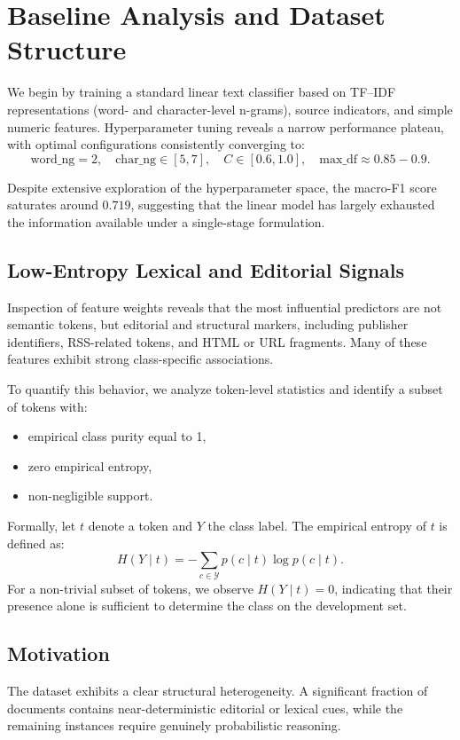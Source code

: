 \section{Baseline Analysis and Dataset Structure}

We begin by training a standard linear text classifier based on TF--IDF representations (word- and character-level n-grams), source indicators, and simple numeric features.
Hyperparameter tuning reveals a narrow performance plateau, with optimal configurations consistently converging to:
\[
\text{word\_ng} = 2,\quad \text{char\_ng} \in [5,7],\quad C \in [0.6,1.0],\quad \text{max\_df} \approx 0.85{-}0.9.
\]

Despite extensive exploration of the hyperparameter space, the macro-F1 score saturates around $0.719$, suggesting that the linear model has largely exhausted the information available under a single-stage formulation.
\subsection{Low-Entropy Lexical and Editorial Signals}

Inspection of feature weights reveals that the most influential predictors are not semantic tokens, but editorial and structural markers, including publisher identifiers, RSS-related tokens, and HTML or URL fragments.
Many of these features exhibit strong class-specific associations.

To quantify this behavior, we analyze token-level statistics and identify a subset of tokens with:
\begin{itemize}
	\item empirical class purity equal to 1,
	\item zero empirical entropy,
	\item non-negligible support.
\end{itemize}

Formally, let $t$ denote a token and $Y$ the class label.
The empirical entropy of $t$ is defined as:
\[
H(Y \mid t) = - \sum_{c \in \mathcal{Y}} p(c \mid t)\log p(c \mid t).
\]
For a non-trivial subset of tokens, we observe $H(Y \mid t) = 0$, indicating that their presence alone is sufficient to determine the class on the development set.
\subsection{Motivation}

The dataset exhibits a clear structural heterogeneity.
A significant fraction of documents contains near-deterministic editorial or lexical cues, while the remaining instances require genuinely probabilistic reasoning.

